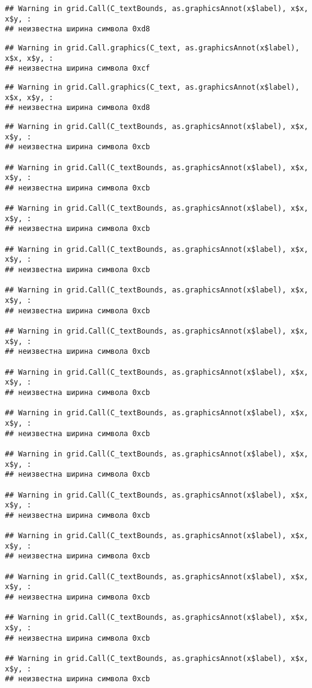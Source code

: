 \documentclass[
]{article}
\begin{document}
\begin{verbatim}
## Warning in grid.Call(C_textBounds, as.graphicsAnnot(x$label), x$x, x$y, :
## неизвестна ширина символа 0xd8
\end{verbatim}

\begin{verbatim}
## Warning in grid.Call.graphics(C_text, as.graphicsAnnot(x$label), x$x, x$y, :
## неизвестна ширина символа 0xcf
\end{verbatim}

\begin{verbatim}
## Warning in grid.Call.graphics(C_text, as.graphicsAnnot(x$label), x$x, x$y, :
## неизвестна ширина символа 0xd8
\end{verbatim}

\begin{verbatim}
## Warning in grid.Call(C_textBounds, as.graphicsAnnot(x$label), x$x, x$y, :
## неизвестна ширина символа 0xcb

## Warning in grid.Call(C_textBounds, as.graphicsAnnot(x$label), x$x, x$y, :
## неизвестна ширина символа 0xcb

## Warning in grid.Call(C_textBounds, as.graphicsAnnot(x$label), x$x, x$y, :
## неизвестна ширина символа 0xcb

## Warning in grid.Call(C_textBounds, as.graphicsAnnot(x$label), x$x, x$y, :
## неизвестна ширина символа 0xcb

## Warning in grid.Call(C_textBounds, as.graphicsAnnot(x$label), x$x, x$y, :
## неизвестна ширина символа 0xcb

## Warning in grid.Call(C_textBounds, as.graphicsAnnot(x$label), x$x, x$y, :
## неизвестна ширина символа 0xcb

## Warning in grid.Call(C_textBounds, as.graphicsAnnot(x$label), x$x, x$y, :
## неизвестна ширина символа 0xcb

## Warning in grid.Call(C_textBounds, as.graphicsAnnot(x$label), x$x, x$y, :
## неизвестна ширина символа 0xcb

## Warning in grid.Call(C_textBounds, as.graphicsAnnot(x$label), x$x, x$y, :
## неизвестна ширина символа 0xcb

## Warning in grid.Call(C_textBounds, as.graphicsAnnot(x$label), x$x, x$y, :
## неизвестна ширина символа 0xcb

## Warning in grid.Call(C_textBounds, as.graphicsAnnot(x$label), x$x, x$y, :
## неизвестна ширина символа 0xcb

## Warning in grid.Call(C_textBounds, as.graphicsAnnot(x$label), x$x, x$y, :
## неизвестна ширина символа 0xcb

## Warning in grid.Call(C_textBounds, as.graphicsAnnot(x$label), x$x, x$y, :
## неизвестна ширина символа 0xcb

## Warning in grid.Call(C_textBounds, as.graphicsAnnot(x$label), x$x, x$y, :
## неизвестна ширина символа 0xcb
\end{verbatim}
\end{document}

